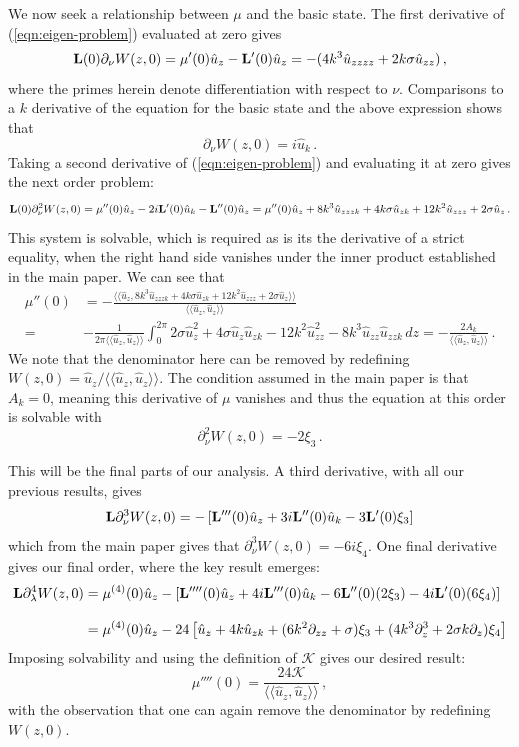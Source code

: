 \documentclass[10pt]{article}
\def\langang{\langle\!\langle} \def\rangang{\rangle\!\rangle}
\begin{document}
\begin{appendix}
We now seek a relationship between $\mu$ and the basic state. The first
derivative of (\ref{eqn:eigen-problem}) evaluated at zero gives
%
\[
{\bf L}(0) \partial_\nu W(z,0) = \mu'(0) \hat{u}_z-{\bf L}'(0)\hat{u}_z = -(4k^3\hat{u}_{zzzz}+2k\sigma \hat{u}_{zz})\,,
\]
%
where the primes herein denote differentiation with respect to $\nu$.
Comparisons to a $k$ derivative of the equation for the basic state and the
above expression shows that
%
\[
\partial_\nu W(z,0) = i\hat{u}_k\,.
\]
%
Taking a second derivative of (\ref{eqn:eigen-problem}) and evaluating it at
zero gives the next order problem:
%
\[
{\bf L}(0)\partial_\nu^2 W(z,0) = \mu''(0)\hat{u}_z-2i{\bf L}'(0)\hat{u}_k-{\bf L}''(0)\hat{u}_z = \mu''(0)\hat{u}_z+8k^3\hat{u}_{zzzk}+4k\sigma \hat{u}_{zk}+12k^2\hat{u}_{zzz}+2\sigma \hat{u}_z\,.
\]
%
This system is solvable, which is required as is its the derivative of a strict
equality, when the right hand side vanishes under the inner product established
in the main paper. We can see that
\[
\begin{split}
\mu''(0) &= -\frac{\langang \hat{u}_z,8k^3\hat{u}_{zzzk}+4k\sigma \hat{u}_{zk}+12k^2\hat{u}_{zzz}+2\sigma \hat{u}_z\rangang}{\langang \hat{u}_z,\hat{u}_z\rangang}\\[3mm]
=& -\frac{1}{2\pi \langang \hat{u}_z,\hat{u}_z\rangang}\int_0^{2\pi}2\sigma \hat{u}_z^2+4\sigma \hat{u}_z\hat{u}_{zk}-12k^2\hat{u}_{zz}^2-8k^3\hat{u}_{zz}\hat{u}_{zzk} \, dz= -\frac{2 A_k}{\langang \hat{u}_z,\hat{u}_z\rangang}\,.
\end{split}
\]
%
We note that the denominator here can be removed by redefining $W(z,0) =
\hat{u}_z/\langang \hat{u}_z,\hat{u}_z\rangang$. 
The condition assumed in the main paper is that $A_k = 0$, meaning this
derivative of $\mu$ vanishes and thus the equation at this order is solvable
with
%
\[
\partial_\nu^2W(z,0) = -2\xi_3\,.
\]
%

This will be the final parts of our analysis. A third derivative, with all our
previous results, gives
%
\[
{\bf L}\partial_\nu^3W(z,0) = -\left[{\bf L}'''(0)\hat{u}_z+3i{\bf L}''(0)\hat{u}_k-3{\bf L}'(0)\xi_3\right]
\]
%
which from the main paper gives that $\partial_\nu^3W(z,0) = -6i\xi_4$. One
final derivative gives our final order, where the key result emerges:
%
\[
\begin{split}
{\bf L}\partial_\lambda^4 W(z,0) &= \mu^{(4)}(0)\hat{u}_z-\left[{\bf L}''''(0)\hat{u}_z+4i{\bf L}'''(0)\hat{u}_k-6{\bf L}''(0)(2\xi_3)-4i{\bf L}'(0)(6\xi_4)\right]\\[3mm]
&=\mu^{(4)}(0)\hat{u}_z-24\left[ \hat{u}_z+4k\hat{u}_{zk}+(6k^2\partial_{zz}+\sigma)\xi_3+(4k^3\partial_z^3+2\sigma k\partial_z)\xi_4\right]
\end{split}
\]
%
Imposing solvability and using the definition of $\mathscr{K}$ gives our desired
result:
%
\[
\mu''''(0) = \frac{24 \mathscr{K}}{\langang \hat{u}_z,\hat{u}_z\rangang}\,,
\]
%
with the observation that one can again remove the denominator by redefining
$W(z,0)$. 
\end{appendix}
\end{document}
